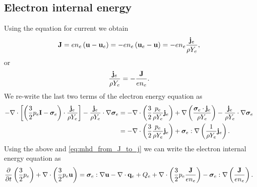 \documentclass[a4paper,11pt]{report}
\begin{document}
\subsection{Electron internal energy}

Using the equation for current we obtain
\begin{equation*}
    \mathbf{J} 
    = e n_e \left( \mathbf{u} - \mathbf{u}_e \right)
    = -e n_e \left( \mathbf{u}_e - \mathbf{u} \right)
    = -e n_e \frac{\mathbf{j}_e}{\rho Y_e},
\end{equation*}
or
\begin{equation}
    \label{eq:mhd_from_J_to_j}
    \frac{\mathbf{j}_e}{\rho Y_e} = -\frac{\mathbf{J}}{e n_e}.
\end{equation}
We re-write the last two terms of the electron energy equation as 
\begin{align*}
    -\nabla \cdot \left[ \left( \frac{3}{2} p_e \mathbf{I} - \bm \sigma_e \right) \cdot \frac{\mathbf{j}_e}{\rho Y_e} \right] - \frac{\mathbf{j}_e}{\rho Y_e} \cdot \nabla \bm \sigma_e &= -\nabla \cdot \left( \frac{3}{2} \frac{p_e}{\rho Y_e} \mathbf{j}_e \right) + \nabla \left( \frac{\bm \sigma_e \cdot \mathbf{j}_e}{\rho Y_e} \right) - \frac{\mathbf{j}_e}{\rho Y_e} \cdot \nabla \bm \sigma_e \\
    &= - \nabla \cdot \left( \frac{3}{2} \frac{p_e}{\rho Y_e} \mathbf{j}_e \right) + \bm \sigma_e : \nabla \left( \frac{1}{\rho Y_e} \mathbf{j}_e \right).
\end{align*}
Using the above and \cref{eq:mhd_from_J_to_j} we can write the electron internal energy equation as
\begin{equation*}
    \frac{\partial}{\partial t} \left( \frac{3}{2} p_e \right) + \nabla \cdot \left( \frac{3}{2} p_e \mathbf{u} \right) = \bm \sigma_e : \nabla \mathbf{u} - \nabla \cdot \mathbf{q}_e + Q_e + \nabla \cdot \left( \frac{3}{2} p_e \frac{\mathbf{J}}{e n_e} \right) - \bm \sigma_e : \nabla \left( \frac{\mathbf{J}}{e n_e} \right).
\end{equation*}
\end{document}
